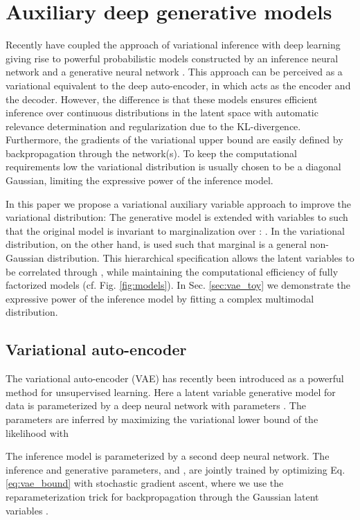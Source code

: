 \documentclass{article}
\begin{document}
\section{Auxiliary deep generative models}
Recently \citet{Kingma13,Rezende14} have coupled the approach of variational inference with deep learning giving rise to powerful probabilistic models constructed by an inference neural network  and a generative neural network . This approach can be perceived as a variational equivalent to the deep auto-encoder, in which  acts as the encoder and  the decoder. However, the difference is that these models ensures efficient inference over continuous distributions in the latent space  with automatic relevance determination and regularization due to the KL-divergence. Furthermore, the gradients of the variational upper bound are easily defined by backpropagation  through the network(s). To keep the computational requirements low the variational distribution  is usually chosen to be a diagonal Gaussian, limiting the expressive power of the inference model.

In this paper we propose a variational auxiliary variable approach \cite{Agakov04} to improve the variational distribution: The generative model is extended with variables  to  such that the original model is invariant to marginalization over : . In the variational distribution, on the other hand,  is used such that marginal  is a general non-Gaussian distribution. This hierarchical specification allows the latent variables to be correlated through , while maintaining the computational efficiency of fully factorized models (cf. Fig. \ref{fig:models}). In Sec. \ref{sec:vae_toy} we demonstrate the expressive power of the inference model by fitting a complex multimodal distribution.

\subsection{Variational auto-encoder}
The variational auto-encoder (VAE) has recently been introduced as a powerful method for unsupervised learning. Here a latent variable generative model  for data  is parameterized by a deep neural network with parameters . The parameters are inferred by maximizing the variational lower bound of the likelihood  with 


The inference model  is parameterized by a second deep neural network. The inference and generative parameters,  and , are jointly trained by optimizing Eq. \ref{eq:vae_bound} with stochastic gradient ascent, where we use the reparameterization trick for backpropagation through the Gaussian latent variables \citep{Kingma13,Rezende14}.
\end{document}
